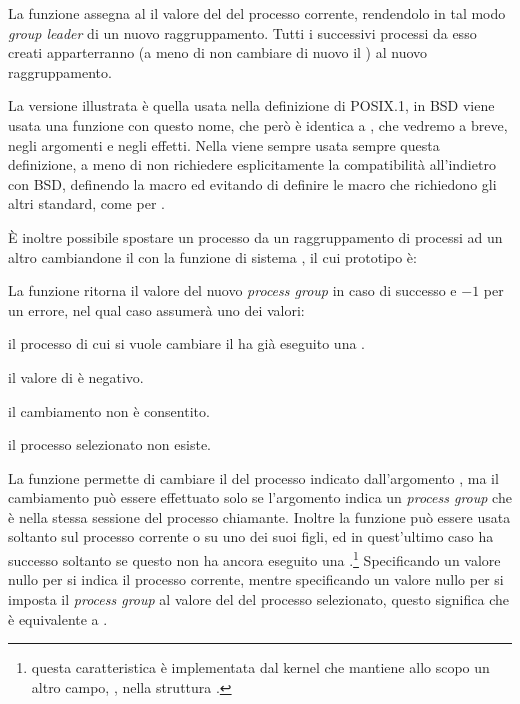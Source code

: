 La funzione assegna al  il valore del  del processo
corrente, rendendolo in tal modo \textit{group leader} di un nuovo
raggruppamento. Tutti i successivi processi da esso creati apparterranno (a
meno di non cambiare di nuovo il ) al nuovo raggruppamento.

La versione illustrata è quella usata nella definizione di POSIX.1, in BSD
viene usata una funzione con questo nome, che però è identica a
, che vedremo a breve, negli argomenti e negli effetti. Nella
 viene sempre usata sempre questa definizione, a meno di non
richiedere esplicitamente la compatibilità all'indietro con BSD, definendo la
macro  ed evitando di definire le macro che richiedono
gli altri standard, come per .

È inoltre possibile spostare un processo da un raggruppamento di processi ad
un altro cambiandone il  con la funzione di sistema ,
il cui prototipo è:

\begin{funcproto}{
}

{La funzione ritorna il valore del nuovo \textit{process group}  in caso di
  successo e $-1$ per un errore, nel qual caso  assumerà uno dei
  valori:
  \begin{errlist}
    \item[\errcode{EACCES}] il processo di cui si vuole cambiare il 
      ha già eseguito una .
    \item[\errcode{EINVAL}] il valore di  è negativo.
    \item[\errcode{EPERM}] il cambiamento non è consentito.
    \item[\errcode{ESRCH}] il processo selezionato non esiste.
  \end{errlist}
}
\end{funcproto}


La funzione permette di cambiare il  del processo indicato
dall'argomento , ma il cambiamento può essere effettuato solo se
l'argomento  indica un \textit{process group} che è nella stessa
sessione del processo chiamante.  Inoltre la funzione può essere usata
soltanto sul processo corrente o su uno dei suoi figli, ed in quest'ultimo
caso ha successo soltanto se questo non ha ancora eseguito una
.\footnote{questa caratteristica è implementata dal kernel che
  mantiene allo scopo un altro campo, , nella struttura
  .}  Specificando un valore nullo per  si
indica il processo corrente, mentre specificando un valore nullo
per  si imposta il \textit{process group} al valore del 
del processo selezionato, questo significa che  è equivalente a
.

